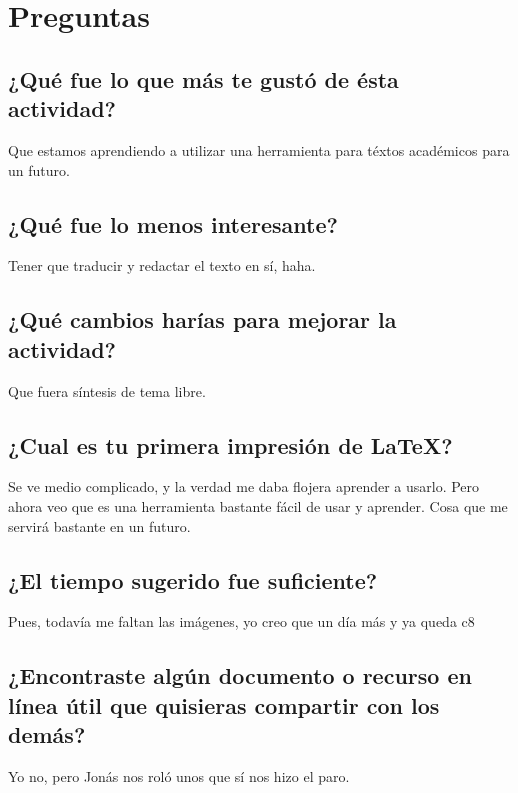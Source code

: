 \documentclass{article}
\begin{document}
\newpage

\section{Preguntas}
\subsection{¿Qué fue lo que más te gustó de ésta actividad?}
Que estamos aprendiendo a utilizar una herramienta para téxtos académicos para un futuro.
\subsection{¿Qué fue lo menos interesante?}
Tener que traducir y redactar el texto en sí, haha.
\subsection{¿Qué cambios harías para mejorar la actividad?}
Que fuera síntesis de tema libre.
\subsection{¿Cual es tu primera impresión de \LaTeX ?}
Se ve medio complicado, y la verdad me daba flojera aprender a usarlo. Pero ahora veo que es una herramienta bastante fácil de usar y aprender. Cosa que me servirá bastante en un futuro.
\subsection{¿El tiempo sugerido fue suficiente?}
Pues, todavía me faltan las imágenes, yo creo que un día más y ya queda c8
\subsection{¿Encontraste algún documento o recurso en línea útil que quisieras compartir con los demás?}
Yo no, pero Jonás nos roló unos que sí nos hizo el paro.
\end{document}
